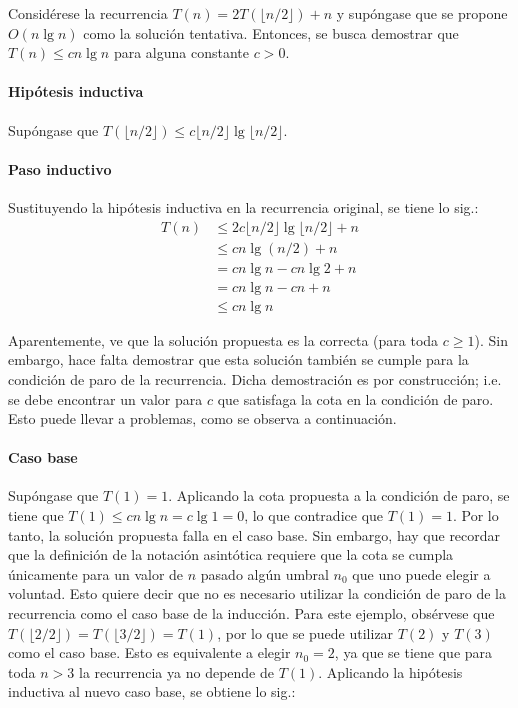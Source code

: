 \begin{expl}
    \label{ex1}
    Considérese la recurrencia $T(n)=2T(\lfloor n/2 \rfloor)+n$ y 
    supóngase que se propone $O(n\lg{n})$ como la solución tentativa. Entonces,
    se busca demostrar que $T(n)\leq cn\lg{n}$ para alguna constante $c>0$.
    
    \paragraph{Hipótesis inductiva}
    Supóngase que $T(\lfloor n/2\rfloor)\leq c\lfloor n/2\rfloor\lg\lfloor n/2\rfloor$.
    
    \paragraph{Paso inductivo}
    Sustituyendo la hipótesis inductiva en la recurrencia original, se tiene lo sig.:
    \begin{align*}
        T(n) &\leq2c\lfloor n/2\rfloor\lg\lfloor n/2\rfloor+n \\
    	&\leq cn\lg(n/2)+n \\
    	&=cn\lg n-cn\lg2+n \\
    	&=cn\lg{n}-cn+n \\
    	&\leq cn\lg n
    \end{align*}
    
    Aparentemente, ve que la solución propuesta es la correcta 
    (para toda $c\geq 1$). Sin embargo, hace falta demostrar que esta solución también se 
    cumple para la condición de paro de la recurrencia. Dicha 
    demostración es por construcción; i.e. se debe encontrar un valor para $c$ que 
    satisfaga la cota en la condición de paro. Esto puede llevar a problemas, como se 
    observa a continuación. 
    
    \paragraph{Caso base}
    Supóngase que $T(1)=1$. Aplicando la cota propuesta a la condición de paro, se tiene que 
    $T(1)\leq cn\lg n=c\lg{1}=0$, lo que contradice que $T(1)=1$. Por lo tanto, la solución 
    propuesta falla en el caso base. Sin embargo, hay que recordar que la definición de la 
    notación asintótica requiere que la cota se cumpla únicamente para un valor de $n$ pasado 
    algún umbral $n_{0}$ que uno puede elegir a voluntad. Esto quiere decir que no es necesario 
    utilizar la condición de paro de la recurrencia como el caso base de la inducción. Para este 
    ejemplo, obsérvese que $T(\lfloor2/2\rfloor)=T(\lfloor3/2\rfloor)=T(1)$, por lo que se puede utilizar 
    $T(2)$ y $T(3)$ como el caso base. Esto es equivalente a elegir $n_0=2$, ya que se tiene
    que para toda $n>3$ la recurrencia ya no depende de $T(1)$.
    Aplicando la hipótesis inductiva al nuevo caso base, se obtiene lo sig.:
    

\end{expl}
